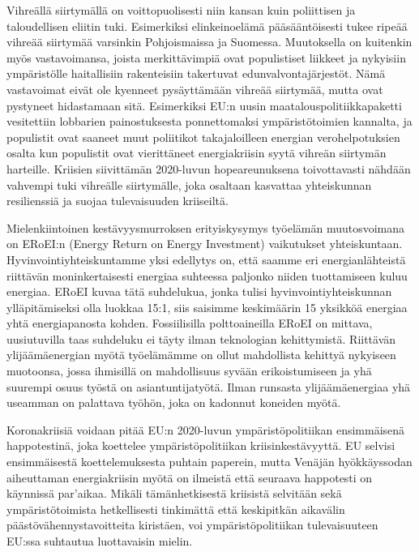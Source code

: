 \documentclass[nobib,finnish,oneside,openany,notoc,a4paper]{tufte-book}
\begin{document}
Vihreällä siirtymällä on voittopuolisesti niin kansan kuin poliittisen ja
taloudellisen eliitin tuki.  Esimerkiksi elinkeinoelämä pääsääntöisesti
tukee ripeää vihreää siirtymää varsinkin Pohjoismaissa ja Suomessa.
Muutoksella on kuitenkin myös vastavoimansa, joista merkittävimpiä ovat
populistiset liikkeet ja nykyisiin ympäristölle haitallisiin
rakenteisiin takertuvat edunvalvontajärjestöt. Nämä vastavoimat eivät
ole kyenneet pysäyttämään vihreää siirtymää, mutta ovat pystyneet
hidastamaan sitä.  Esimerkiksi EU:n uusin maatalouspolitiikkapaketti
vesitettiin lobbarien painostuksesta ponnettomaksi ympäristötoimien
kannalta, ja populistit ovat saaneet muut poliitikot takajaloilleen
energian verohelpotuksien osalta kun populistit ovat vierittäneet
energiakriisin syytä vihreän siirtymän harteille. Kriisien siivittämän
2020-luvun hopeareunuksena toivottavasti nähdään vahvempi tuki vihreälle
siirtymälle, joka osaltaan kasvattaa yhteiskunnan resilienssiä ja suojaa
tulevaisuuden kriiseiltä.

Mielenkiintoinen kestävyysmurroksen erityiskysymys työelämän
muutosvoimana on ERoEI:n (Energy Return on Energy Investment)
vaikutukset yhteiskuntaan. Hyvinvointiyhteiskuntamme yksi edellytys on,
että saamme eri energianlähteistä riittävän moninkertaisesti energiaa
suhteessa paljonko niiden tuottamiseen kuluu energiaa. ERoEI kuvaa tätä
suhdelukua, jonka tulisi hyvinvointiyhteiskunnan ylläpitämiseksi olla
luokkaa 15:1, siis saisimme keskimäärin 15 yksikköä energiaa yhtä
energiapanosta kohden. Fossiilisilla polttoaineilla ERoEI on mittava,
uusiutuvilla taas suhdeluku ei täyty ilman teknologian kehittymistä.
Riittävän ylijäämäenergian myötä työelämämme on ollut mahdollista
kehittyä nykyiseen muotoonsa, jossa ihmisillä on mahdollisuus syvään
erikoistumiseen ja yhä suurempi osuus työstä on asiantuntijatyötä. Ilman
runsasta ylijäämäenergiaa yhä useamman on palattava työhön, joka on
kadonnut koneiden myötä. 

Koronakriisiä voidaan pitää EU:n 2020-luvun ympäristöpolitiikan
ensimmäisenä happotestinä, joka koettelee ympäristöpolitiikan
kriisinkestävyyttä. EU selvisi ensimmäisestä koettelemuksesta puhtain
paperein, mutta Venäjän hyökkäyssodan aiheuttaman energiakriisin myötä
on ilmeistä että seuraava happotesti on käynnissä par'aikaa. Mikäli
tämänhetkisestä kriisistä selvitään sekä ympäristötoimista hetkellisesti
tinkimättä että keskipitkän aikavälin päästövähennystavoitteita
kiristäen, voi ympäristöpolitiikan tulevaisuuteen EU:ssa suhtautua
luottavaisin mielin.
\end{document}
